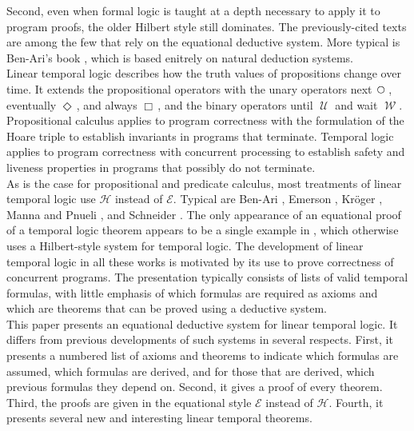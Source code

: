 \documentclass[fleqn, leqno]{article}
\newcommand{\Until}{\;\mathcal{U}\;}
\newcommand{\Wait}{\;\mathcal{W}\;}
\newcommand{\Next}{\;\,\text{\raisebox{3.5pt}{\circle{6}}}}
\newcommand{\Event}{\Diamond\,}
\newcommand{\Always}{\Box\,}
\begin{document}
Second, even when formal logic is taught at a depth necessary to apply it to program proofs, the older Hilbert style
still dominates.
The previously-cited texts \cite{Cohen, LADM, Kald} are among the few that rely on the equational deductive system. 
More typical is Ben-Ari's book \cite{Ben}, which is based enitrely on natural deduction systems.\\

Linear temporal logic describes how the truth values of propositions change over time.
It extends the propositional operators with the unary operators next $\Next$, eventually $\Event$, and always $\Always$,
and the binary operators until $\Until$ and wait $\Wait$.
Propositional calculus applies to program correctness with the formulation of the Hoare triple to establish invariants
in programs that terminate.
Temporal logic applies to program correctness with concurrent processing to establish safety and liveness properties
in programs that possibly do not terminate.\\

As is the case for propositional and predicate calculus, most treatments of linear temporal logic use $\mathcal{H}$
instead of $\mathcal{E}$. Typical are Ben-Ari \cite{Ben2}, Emerson \cite{Emer}, Kr\"{o}ger \cite{Kroger},
Manna and Pnueli \cite{Manna}, and Schneider \cite{Schn}.
The only appearance of an equational proof of a temporal logic theorem appears to be a single example in \cite{Schn},
which otherwise uses a Hilbert-style system for temporal logic.
The development of linear temporal logic in all these works is motivated by its use to prove correctness of concurrent programs.
The presentation typically consists of lists of valid temporal formulas, with little emphasis of which formulas are required
as axioms and which are theorems that can be proved using a deductive system.\\

This paper presents an equational deductive system for linear temporal logic.
It differs from previous developments of such systems in several respects.
First, it presents a numbered list of axioms and theorems to indicate which formulas are assumed, which formulas are
derived, and for those that are derived, which previous formulas they depend on.
Second, it gives a proof of every theorem.
Third, the proofs are given in the equational style $\mathcal{E}$ instead of $\mathcal{H}$.
Fourth, it presents several new and interesting linear temporal theorems.\\
\end{document}
